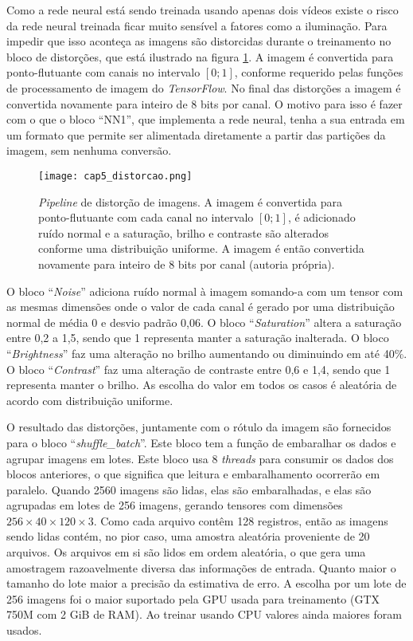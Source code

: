 Como a rede neural está sendo treinada usando apenas dois vídeos existe o risco
da rede neural treinada ficar muito sensível a fatores como a iluminação. Para
impedir que isso aconteça as imagens são distorcidas durante o treinamento no
bloco de distorções, que está ilustrado na figura \ref{fig:cap5_distorcao}.
A imagem é convertida para ponto-flutuante com canais no intervalo $[0;1]$,
conforme requerido pelas funções de processamento de imagem do
\emph{TensorFlow}.  No final das distorções a imagem é convertida
novamente para inteiro de 8 bits por canal. O motivo para isso é fazer com o
que o bloco ``NN1'', que implementa a rede neural, tenha a sua entrada em um
formato que permite ser alimentada diretamente a partir das partições da
imagem, sem nenhuma conversão.

\begin{figure}[!htb]
	\centering
	\texttt{[image: cap5\_distorcao.png]}
	\caption[\emph{Pipeline} de distorção de imagens]{
		\emph{Pipeline} de distorção de imagens.
		A imagem é convertida para ponto-flutuante com cada canal no intervalo
		$[0;1]$, é adicionado ruído normal e a saturação, brilho e contraste são
		alterados conforme uma distribuição uniforme. A imagem é então convertida
		novamente para inteiro de 8 bits por canal (autoria própria).}
	\label{fig:cap5_distorcao}
\end{figure}

O bloco ``\emph{Noise}'' adiciona ruído normal à imagem somando-a com um
tensor com as mesmas dimensões onde o valor de cada canal é gerado por
uma distribuição normal de média 0 e desvio padrão 0,06.
O bloco ``\emph{Saturation}'' altera a saturação entre 0,2 a 1,5, sendo que 1
representa manter a saturação inalterada. O bloco ``\emph{Brightness}'' faz
uma alteração no brilho aumentando ou diminuindo em até 40\%. O bloco
``\emph{Contrast}'' faz uma alteração de
contraste entre 0,6 e 1,4, sendo que 1 representa manter o brilho. As escolha
do valor em todos os casos é aleatória de acordo com distribuição uniforme.

O resultado das distorções, juntamente com o rótulo da imagem são fornecidos
para o bloco ``\emph{shuffle\_batch}''. Este bloco tem a função de embaralhar os
dados e agrupar imagens em lotes. Este bloco usa 8 \emph{threads} para consumir
os dados dos blocos anteriores, o que significa que leitura e embaralhamento
ocorrerão em paralelo. Quando 2560 imagens são lidas, elas são embaralhadas, e
elas são agrupadas em lotes de 256 imagens, gerando tensores com
dimensões $256 \times 40 \times 120 \times 3$. Como cada arquivo contêm
128 registros, então as imagens
sendo lidas contém, no pior caso, uma amostra aleatória proveniente de 20
arquivos. Os arquivos em si são lidos em ordem aleatória, o que gera uma
amostragem razoavelmente diversa das informações de entrada.
Quanto maior o tamanho do lote maior a precisão da estimativa de erro.
A escolha por um lote de 256 imagens foi o maior suportado
pela GPU usada para treinamento (GTX 750M com 2 GiB de RAM). Ao treinar
usando CPU valores ainda maiores foram usados.

